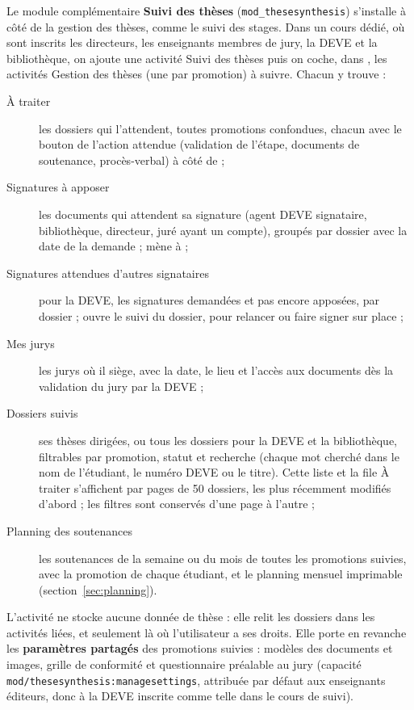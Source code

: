 \documentclass[11pt,a4paper]{article}
\begin{document}
Le module complémentaire \textbf{Suivi des thèses} (\texttt{mod\_thesesynthesis})
s'installe à côté de la gestion des thèses, comme le suivi des stages. Dans un
cours dédié, où sont inscrits les directeurs, les enseignants membres de jury,
la DEVE et la bibliothèque, on ajoute une activité \og Suivi des thèses\fg{}
puis on coche, dans , les activités \og Gestion des
thèses\fg{} (une par promotion) à suivre. Chacun y trouve :
\begin{description}
  \item[À traiter] les dossiers qui l'attendent, toutes promotions confondues,
        chacun avec le bouton de l'action attendue (validation de l'étape,
        documents de soutenance, procès-verbal) à côté de  ;
  \item[Signatures à apposer] les documents qui attendent sa signature (agent
        DEVE signataire, bibliothèque, directeur, juré ayant un compte), groupés
        par dossier avec la date de la demande ;  mène à
         ;
  \item[Signatures attendues d'autres signataires] pour la DEVE, les signatures
        demandées et pas encore apposées, par dossier ;  ouvre le suivi du dossier, pour relancer ou faire signer sur
        place ;
  \item[Mes jurys] les jurys où il siège, avec la date, le lieu et l'accès aux
        documents dès la validation du jury par la DEVE ;
  \item[Dossiers suivis] ses thèses dirigées, ou tous les dossiers pour la DEVE
        et la bibliothèque, filtrables par promotion, statut et recherche (chaque
        mot cherché dans le nom de l'étudiant, le numéro DEVE ou le titre). Cette
        liste et la file \og À traiter\fg{} s'affichent par pages de 50 dossiers,
        les plus récemment modifiés d'abord ; les filtres sont conservés d'une
        page à l'autre ;
  \item[Planning des soutenances] les soutenances de la semaine ou du mois de
        toutes les promotions suivies, avec la promotion de chaque étudiant, et
        le planning mensuel imprimable (section~\ref{sec:planning}).
\end{description}


L'activité ne stocke aucune donnée de thèse : elle relit les dossiers dans les
activités liées, et seulement là où l'utilisateur a ses droits. Elle porte en
revanche les \textbf{paramètres partagés} des promotions suivies : modèles des
documents et images, grille de conformité et questionnaire préalable au jury
(capacité \texttt{mod/thesesynthesis:managesettings}, attribuée par défaut aux
enseignants éditeurs, donc à la DEVE inscrite comme telle dans le cours de
suivi).
\end{document}
